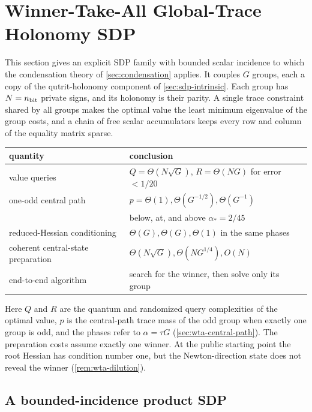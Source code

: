 \section{Winner-Take-All Global-Trace Holonomy SDP}
\label{sec:winner-take-all}

This section gives an explicit SDP family with bounded scalar incidence to
which the condensation theory of \cref{sec:condensation} applies.  It couples
$G$ groups, each a copy of the qutrit-holonomy component of
\cref{sec:sdp-intrinsic}.  Each group has \(N=n_{\rm bit}\) private signs,
and its holonomy is their parity.  A single trace constraint shared by all
groups makes the optimal value the least minimum eigenvalue of the group
costs, and a chain of free scalar accumulators keeps every row and column of
the equality matrix sparse.

\begin{center}
\begin{tabular}{@{}ll@{}}
\toprule
quantity & conclusion \\ \midrule
value queries & $Q=\Theta(N\sqrt G)$, $R=\Theta(NG)$ for error $<1/20$ \\
one-odd central path & $p=\Theta(1),\Theta(G^{-1/2}),\Theta(G^{-1})$ \\
 & below, at, and above $\alpha_*=2/45$ \\
reduced-Hessian conditioning & $\Theta(G),\Theta(G),\Theta(1)$ in the same phases \\
coherent central-state preparation & $\Theta(N\sqrt G),\Theta(NG^{1/4}),O(N)$ \\
end-to-end algorithm & search for the winner, then solve only its group \\
\bottomrule
\end{tabular}
\end{center}
Here $Q$ and $R$ are the quantum and randomized query complexities of the
optimal value, $p$ is the central-path trace mass of the odd group when
exactly one group is odd, and the phases refer to $\alpha=\tau G$
(\cref{sec:wta-central-path}).  The preparation costs assume exactly one
winner.  At the public starting point the root Hessian has condition number
one, but the Newton-direction state does not reveal the winner
(\cref{rem:wta-dilution}).

\subsection{A bounded-incidence product SDP}
\label{sec:wta-construction}

